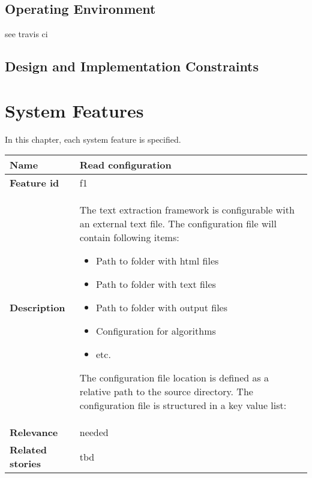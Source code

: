 \subsection{Operating Environment}

see travis ci 


\subsection{Design and Implementation Constraints}





\section{System Features}

In this chapter, each system feature is specified. 


	\begin{tabular}{ | p{3cm} | p{12cm} |}
	\hline
	\textbf{Name} 				& Read configuration 				\\ \hline
	\textbf{Feature id} 		& f1 				\\ \hline
	\textbf{Description} 		& The text extraction framework is configurable with an external text file. The configuration file will contain following items:
								 \begin{itemize}
							        \item Path to folder with html files
							        \item Path to folder with text files
							        \item Path to folder with output files
							        \item Configuration for algorithms
							        \item etc.
						        \end{itemize}

						        The configuration file location is defined as a relative path to the source directory. The configuration file is structured in a key value list:
						         \\ \hline
	\textbf{Relevance} 			& needed 			\\ \hline
	\textbf{Related stories} 	& tbd		\\ \hline
	\end{tabular} \\


